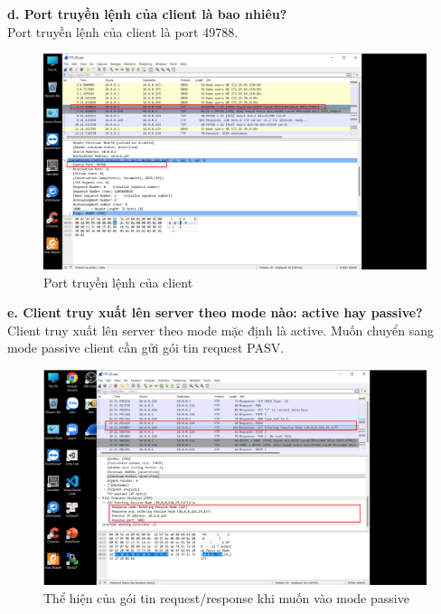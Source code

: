 \textbf{d.	Port truyền lệnh của client là bao nhiêu?}\\
Port truyền lệnh của client là port 49788.
\begin{figure}[H]
\begin{center}
\includegraphics[scale=.8]{../figures/p5/p5_2}
\end{center}
\caption{Port truyền lệnh của client}
\end{figure}

\textbf{e.	Client truy xuất lên server theo mode nào: active hay passive?}\\
Client truy xuất lên server theo mode mặc định là active.
Muốn chuyển sang mode passive client cần gửi gói tin request PASV.
\begin{figure}[H]
\begin{center}
\includegraphics[scale=.8]{../figures/p5/p5_3}
\end{center}
\caption{Thể hiện của gói tin request/response khi muốn vào mode passive}
\end{figure}

